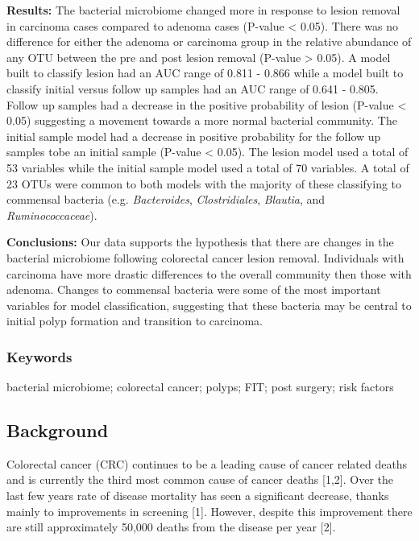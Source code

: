 \documentclass[12pt,]{article}
\begin{document}
\textbf{Results:} The bacterial microbiome changed more in response to
lesion removal in carcinoma cases compared to adenoma cases (P-value
\textless{} 0.05). There was no difference for either the adenoma or
carcinoma group in the relative abundance of any OTU between the pre and
post lesion removal (P-value \textgreater{} 0.05). A model built to
classify lesion had an AUC range of 0.811 - 0.866 while a model built to
classify initial versus follow up samples had an AUC range of 0.641 -
0.805. Follow up samples had a decrease in the positive probability of
lesion (P-value \textless{} 0.05) suggesting a movement towards a more
normal bacterial community. The initial sample model had a decrease in
positive probability for the follow up samples tobe an initial sample
(P-value \textless{} 0.05). The lesion model used a total of 53
variables while the initial sample model used a total of 70 variables. A
total of 23 OTUs were common to both models with the majority of these
classifying to commensal bacteria (e.g. \emph{Bacteroides},
\emph{Clostridiales}, \emph{Blautia}, and \emph{Ruminococcaceae}).

\textbf{Conclusions:} Our data supports the hypothesis that there are
changes in the bacterial microbiome following colorectal cancer lesion
removal. Individuals with carcinoma have more drastic differences to the
overall community then those with adenoma. Changes to commensal bacteria
were some of the most important variables for model classification,
suggesting that these bacteria may be central to initial polyp formation
and transition to carcinoma.

\newpage

\subsubsection{Keywords}\label{keywords}

bacterial microbiome; colorectal cancer; polyps; FIT; post surgery; risk
factors

\newpage

\subsection{Background}\label{background}

Colorectal cancer (CRC) continues to be a leading cause of cancer
related deaths and is currently the third most common cause of cancer
deaths {[}1,2{]}. Over the last few years rate of disease mortality has
seen a significant decrease, thanks mainly to improvements in screening
{[}1{]}. However, despite this improvement there are still approximately
50,000 deaths from the disease per year {[}2{]}.
\end{document}
